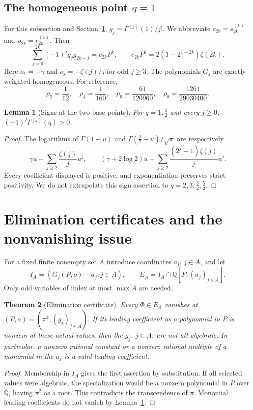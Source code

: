 \documentclass[11pt,a4paper]{article}
\newtheorem{theorem}{Theorem}[section]
\newtheorem{lemma}[theorem]{Lemma}
\theoremstyle{definition}\newtheorem{definition}[theorem]{Definition}
\theoremstyle{remark}\newtheorem{remark}[theorem]{Remark}
\newcommand{\Q}{\mathbb Q}\newcommand{\Qb}{\overline{\mathbb Q}}
\begin{document}
\subsection{The homogeneous point \texorpdfstring{$q=1$}{q=1}}
For this subsection and Section~\ref{sec:elim}, $g_j=\Gamma^{(j)}(1)/j!$. We abbreviate $c_{2k}=s_{2k}^{(1)}$ and $\rho_{2k}=r_{2k}^{(1)}$. Then
\begin{equation}\label{eq:Q}
\sum_{j=0}^{2k}(-1)^jg_jg_{2k-j}=c_{2k}P^k,
\qquad c_{2k}P^k=2(1-2^{1-2k})\zeta(2k).
\end{equation}
Here $o_1=-\gamma$ and $o_j=-\zeta(j)/j$ for odd $j\ge3$. The polynomials $G_j$ are exactly weighted homogeneous. For reference,
\[
\rho_2=\frac1{12},\quad\rho_4=\frac1{160},\quad
\rho_6=\frac{61}{120960},\quad\rho_8=\frac{1261}{29030400}.
\]
\begin{lemma}[Signs at the two base points]\label{lem:sign}
For $q=1,\tfrac12$ and every $j\ge0$, $(-1)^j\Gamma^{(j)}(q)>0$.
\end{lemma}
\begin{proof}
The logarithms of $\Gamma(1-u)$ and $\Gamma(\tfrac12-u)/\sqrt\pi$ are respectively
\[
\gamma u+\sum_{j\ge2}\frac{\zeta(j)}j u^j,
\qquad
(\gamma+2\log2)u+\sum_{j\ge2}\frac{(2^j-1)\zeta(j)}j u^j.
\]
Every coefficient displayed is positive, and exponentiation preserves strict positivity. We do not extrapolate this sign assertion to $q=2,3,\tfrac32,\tfrac52$.
\end{proof}
\section{Elimination certificates and the nonvanishing issue}\label{sec:elim}
For a fixed finite nonempty set $A$ introduce coordinates $a_j$, $j\in A$, and let
\[
I_A=(G_j(P,o)-a_j:j\in A),\qquad
E_A=I_A\cap\Q[P,(a_j)_{j\in A}].
\]
Only odd variables of index at most $\max A$ are needed.

\begin{theorem}[Elimination certificate]\label{thm:elim}
Every $\Phi\in E_A$ vanishes at $(P,a)=(\pi^2,(g_j)_{j\in A})$.
If its leading coefficient as a polynomial in $P$ is nonzero at these actual values, then the $g_j$, $j\in A$, are not all algebraic. In particular, a nonzero rational constant or a nonzero rational multiple of a monomial in the $a_j$ is a valid leading coefficient.
\end{theorem}
\begin{proof}
Membership in $I_A$ gives the first assertion by substitution. If all selected values were algebraic, the specialization would be a nonzero polynomial in $P$ over $\Qb$, having $\pi^2$ as a root. This contradicts the transcendence of $\pi$. Monomial leading coefficients do not vanish by Lemma~\ref{lem:sign}.
\end{proof}
\end{document}
